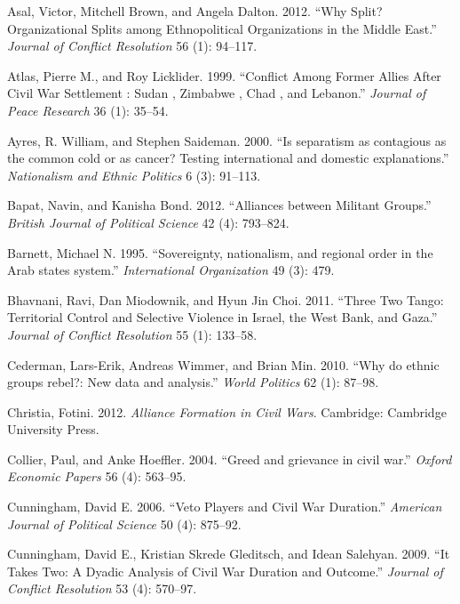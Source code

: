 \documentclass[12pt,]{book}
\theoremstyle{definition}
\theoremstyle{definition}
\theoremstyle{remark}
\begin{document}
\hypertarget{ref-Asal2012}{}
Asal, Victor, Mitchell Brown, and Angela Dalton. 2012. ``Why Split?
Organizational Splits among Ethnopolitical Organizations in the Middle
East.'' \emph{Journal of Conflict Resolution} 56 (1): 94--117.

\hypertarget{ref-Atlas1999}{}
Atlas, Pierre M., and Roy Licklider. 1999. ``Conflict Among Former
Allies After Civil War Settlement : Sudan , Zimbabwe , Chad , and
Lebanon.'' \emph{Journal of Peace Research} 36 (1): 35--54.

\hypertarget{ref-Ayres2000}{}
Ayres, R. William, and Stephen Saideman. 2000. ``Is separatism as
contagious as the common cold or as cancer? Testing international and
domestic explanations.'' \emph{Nationalism and Ethnic Politics} 6 (3):
91--113.

\hypertarget{ref-Bapat2012}{}
Bapat, Navin, and Kanisha Bond. 2012. ``Alliances between Militant
Groups.'' \emph{British Journal of Political Science} 42 (4): 793--824.

\hypertarget{ref-Barnett1995}{}
Barnett, Michael N. 1995. ``Sovereignty, nationalism, and regional order
in the Arab states system.'' \emph{International Organization} 49 (3):
479.

\hypertarget{ref-Bhavnani2011}{}
Bhavnani, Ravi, Dan Miodownik, and Hyun Jin Choi. 2011. ``Three Two
Tango: Territorial Control and Selective Violence in Israel, the West
Bank, and Gaza.'' \emph{Journal of Conflict Resolution} 55 (1): 133--58.

\hypertarget{ref-Cederman2010}{}
Cederman, Lars-Erik, Andreas Wimmer, and Brian Min. 2010. ``Why do
ethnic groups rebel?: New data and analysis.'' \emph{World Politics} 62
(1): 87--98.

\hypertarget{ref-Christia2012}{}
Christia, Fotini. 2012. \emph{Alliance Formation in Civil Wars}.
Cambridge: Cambridge University Press.

\hypertarget{ref-Collier2004}{}
Collier, Paul, and Anke Hoeffler. 2004. ``Greed and grievance in civil
war.'' \emph{Oxford Economic Papers} 56 (4): 563--95.

\hypertarget{ref-Cunningham2006}{}
Cunningham, David E. 2006. ``Veto Players and Civil War Duration.''
\emph{American Journal of Political Science} 50 (4): 875--92.

\hypertarget{ref-Cunningham2009}{}
Cunningham, David E., Kristian Skrede Gleditsch, and Idean Salehyan.
2009. ``It Takes Two: A Dyadic Analysis of Civil War Duration and
Outcome.'' \emph{Journal of Conflict Resolution} 53 (4): 570--97.
\end{document}
